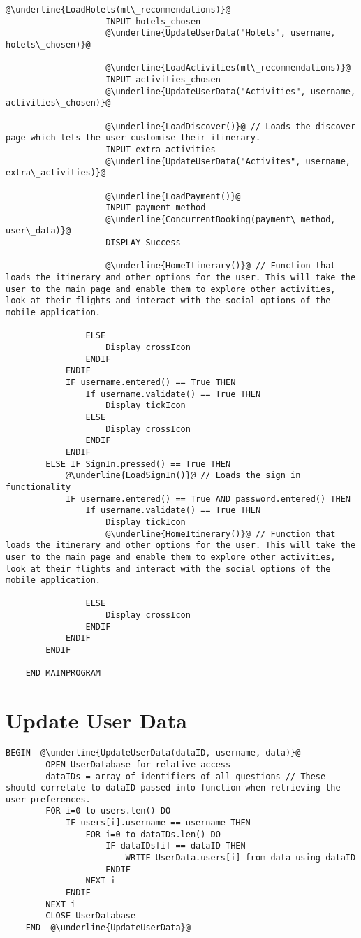 \begin{lstlisting}[caption=Main Program, escapechar=\@]
					@\underline{LoadHotels(ml\_recommendations)}@
					INPUT hotels_chosen
					@\underline{UpdateUserData("Hotels", username, hotels\_chosen)}@

					@\underline{LoadActivities(ml\_recommendations)}@
					INPUT activities_chosen
					@\underline{UpdateUserData("Activities", username, activities\_chosen)}@

					@\underline{LoadDiscover()}@ // Loads the discover page which lets the user customise their itinerary.
					INPUT extra_activities
					@\underline{UpdateUserData("Activites", username, extra\_activities)}@

					@\underline{LoadPayment()}@ 
					INPUT payment_method
					@\underline{ConcurrentBooking(payment\_method, user\_data)}@
					DISPLAY Success

					@\underline{HomeItinerary()}@ // Function that loads the itinerary and other options for the user. This will take the user to the main page and enable them to explore other activities, look at their flights and interact with the social options of the mobile application.

				ELSE
					Display crossIcon
				ENDIF
			ENDIF
			IF username.entered() == True THEN
				If username.validate() == True THEN
					Display tickIcon
				ELSE
					Display crossIcon
				ENDIF
			ENDIF
		ELSE IF SignIn.pressed() == True THEN
			@\underline{LoadSignIn()}@ // Loads the sign in functionality
			IF username.entered() == True AND password.entered() THEN
				If username.validate() == True THEN
					Display tickIcon
					@\underline{HomeItinerary()}@ // Function that loads the itinerary and other options for the user. This will take the user to the main page and enable them to explore other activities, look at their flights and interact with the social options of the mobile application.

				ELSE
					Display crossIcon
				ENDIF
			ENDIF
		ENDIF

	END MAINPROGRAM

\end{lstlisting}

\section{Update User Data}

\begin{lstlisting}[caption=Update User Data, escapechar=\@]
	BEGIN  @\underline{UpdateUserData(dataID, username, data)}@
		OPEN UserDatabase for relative access
		dataIDs = array of identifiers of all questions // These should correlate to dataID passed into function when retrieving the user preferences.
		FOR i=0 to users.len() DO
			IF users[i].username == username THEN
				FOR i=0 to dataIDs.len() DO
					IF dataIDs[i] == dataID THEN
						WRITE UserData.users[i] from data using dataID	
					ENDIF
				NEXT i
			ENDIF
		NEXT i
		CLOSE UserDatabase
	END  @\underline{UpdateUserData}@
\end{lstlisting}

